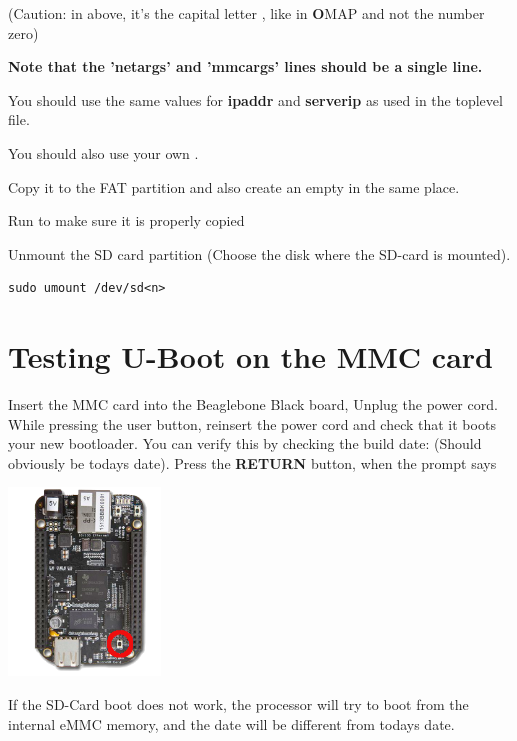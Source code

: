(Caution: in  above, it's the capital letter , like in
{\bf O}MAP and not the number zero)

{\bf Note that the 'netargs' and 'mmcargs' lines should be a single line.}

You should use the same values for {\bf ipaddr} and {\bf serverip} as used in the toplevel  file.

You should also use your own {\bf {}}.

Copy  it to the FAT partition and also create an empty  in the same place.

Run  to make sure it is properly copied

Unmount the SD card partition (Choose the disk where the SD-card is mounted).

\begin{verbatim}
sudo umount /dev/sd<n>
\end{verbatim}

\clearpage

\section{Testing U-Boot on the MMC card}

Insert the MMC card into the Beaglebone Black board, Unplug the power cord.
While pressing the user button, reinsert the power cord and check that it boots your new bootloader. 
You can verify this by checking the build date: (Should obviously be todays date). 
Press the {\bf RETURN} button, when the prompt says 

\begin{center}
    \includegraphics[height=5cm]{labs/sysdev-u-boot-BBB/beagleboneblack-user-button.png}
\end{center}

If the SD-Card boot does not work, the processor will try to boot from the internal eMMC memory,
and the date will be different from todays date.

